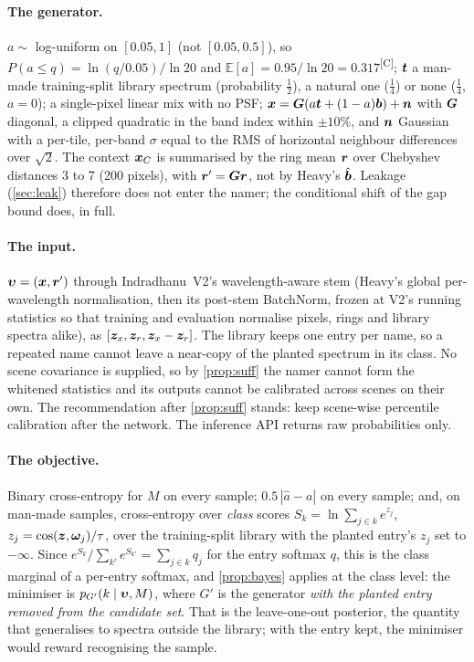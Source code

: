 \documentclass[11pt,a4paper]{article}
\theoremstyle{plain}
\theoremstyle{definition}
\theoremstyle{remark}
\newcommand{\E}{\mathbb{E}}
\newcommand{\x}{\B{x}}
\newcommand{\bvec}{\B{b}}
\newcommand{\bh}{\hat{\B{b}}}
\newcommand{\tv}{\B{t}}
\newcommand{\rv}{\B{r}}
\newcommand{\nv}{\B{n}}
\newcommand{\zv}{\B{z}}
\newcommand{\Gm}{\B{G}}
\newcommand{\comp}{\textsuperscript{\textsf{\scriptsize[C]}}}
\begin{document}
\paragraph{The generator.} $a\sim$ log-uniform on $[0.05,1]$ (not $[0.05,0.5]$), so $P(a\le q)=\ln(q/0.05)/\ln20$ and $\E[a]=0.95/\ln20=0.317$\comp; $\tv$ a
man-made training-split library spectrum (probability $\frac12$), a natural one ($\frac14$) or none ($\frac14$, $a=0$); a single-pixel linear mix with no PSF;
$\x=\Gm(a\tv+(1-a)\bvec)+\nv$ with $\Gm$ diagonal, a clipped quadratic in the band index within $\pm10\%$, and $\nv$ Gaussian with a per-tile, per-band $\sigma$
equal to the RMS of horizontal neighbour differences over $\sqrt2$. The context $\x_C$ is summarised by the ring mean $\rv$ over Chebyshev distances 3 to 7 (200
pixels), with $\rv'=\Gm\rv$, not by Heavy's $\bh$. Leakage (\cref{sec:leak}) therefore does not enter the namer; the conditional shift of the gap bound does, in full.

\paragraph{The input.} $\B\upsilon=(\x,\rv')$ through Indradhanu~V2's wavelength-aware stem (Heavy's global per-wavelength normalisation, then its post-stem
BatchNorm, frozen at V2's running statistics so that training and evaluation normalise pixels, rings and library spectra alike), as
$[\zv_x,\zv_r,\zv_x-\zv_r]$. The library keeps one entry per name, so a repeated name cannot leave a near-copy of the planted spectrum in its class. No scene covariance is supplied, so by \cref{prop:suff} the namer cannot form the whitened statistics and its outputs
cannot be calibrated across scenes on their own. The recommendation after \cref{prop:suff} stands: keep scene-wise percentile calibration after the network. The
inference API returns raw probabilities only.

\paragraph{The objective.} Binary cross-entropy for $M$ on every sample; $0.5\,|\hat a-a|$ on every sample; and, on man-made samples, cross-entropy over
\emph{class} scores $S_k=\ln\sum_{j\in k}e^{z_j}$, $z_j=\cos(\zv,\B\omega_j)/\tau$, over the training-split library with the planted entry's $z_j$ set to $-\infty$. Since
$e^{S_k}/\sum_{k'}e^{S_{k'}}=\sum_{j\in k}q_j$ for the entry softmax $q$, this is the class marginal of a per-entry softmax, and \cref{prop:bayes} applies at the
class level: the minimiser is $p_{G'}(k\mid\bm{\upsilon},M)$, where $G'$ is the generator \emph{with the planted entry removed from the candidate set}. That is the
leave-one-out posterior, the quantity that generalises to spectra outside the library; with the entry kept, the minimiser would reward recognising the sample.
\end{document}
